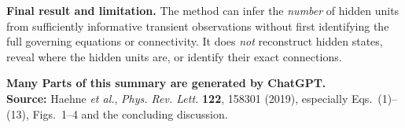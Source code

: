 \documentclass[10pt,a4paper]{article}
\begin{document}
\noindent\colorbox{navy!6}{\parbox{\dimexpr\linewidth-2\fboxsep\relax}{\textbf{Final result and limitation.} The method can infer the \emph{number} of hidden units from sufficiently informative transient observations without first identifying the full governing equations or connectivity. It does \emph{not} reconstruct hidden states, reveal where the hidden units are, or identify their exact connections.}}

\vspace{3pt}
\color{muted}\textbf{Many Parts of this summary are generated by ChatGPT.}
\\
{\footnotesize\color{muted}\textbf{Source:} Haehne \emph{et al.}, \emph{Phys. Rev. Lett.} \textbf{122}, 158301 (2019), especially Eqs.~(1)--(13), Figs.~1--4 and the concluding discussion.}
\end{document}
